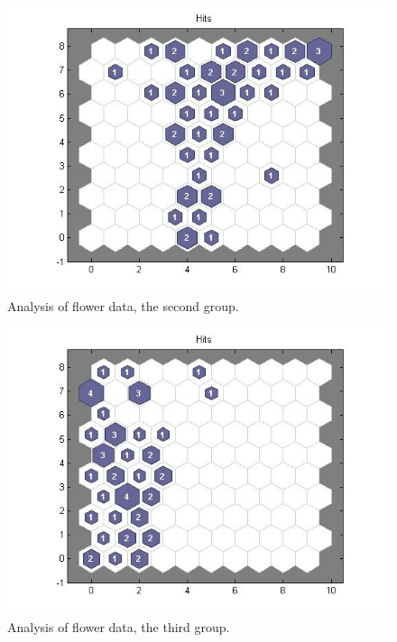 \documentclass[a4paper]{article}
\begin{document}
  \begin{figure}[H] %
	 \includegraphics[scale=0.5]{q4_plotsom50_100.jpg}
	 \caption{\label{fig:plotg2} Analysis of flower data, the second group.}
 \end{figure}
  \begin{figure}[H] %
	 \includegraphics[scale=0.5]{q4_plotsom100_150.jpg}
	 \caption{\label{fig:plotg3} Analysis of flower data, the third group.}
 \end{figure}
\end{document}

